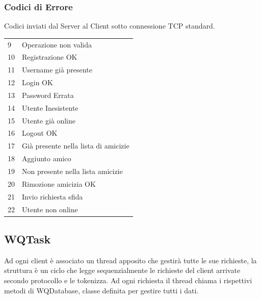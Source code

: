\documentclass{article}
\begin{document}
\subsubsection{Codici di Errore}
Codici inviati dal Server al Client sotto connessione TCP standard.
\begin{table}[h]
\centering
\begin{tabular}{l|l}
9  & Operazione non valida                 \\
10 & Registrazione OK                      \\
11 & Username già presente                 \\
12 & Login OK                              \\
13 & Password Errata                       \\
14 & Utente Inesistente                    \\
15 & Utente già online                     \\
16 & Logout OK                             \\
17 & Già presente nella lista di amicizie  \\
18 & Aggiunto amico                        \\
19 & Non presente nella lista amicizie                     \\
20 & Rimozione amicizia OK                 \\
21 & Invio richiesta sfida                 \\
22 & Utente non online                    
\end{tabular}
\end{table}

\subsection{WQTask}
Ad ogni client è associato un thread apposito che gestirà tutte le sue richieste, la struttura è un ciclo che legge sequenzialmente le richieste del client arrivate secondo protocollo e le tokenizza. Ad ogni richiesta il thread chiama i rispettivi metodi di WQDatabase, classe definita per gestire tutti i dati. 
\end{document}
